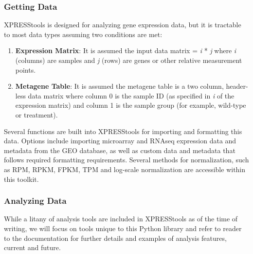 \documentclass[11pt, a4paper, oneside]{article}
\begin{document}
\subsubsection{Getting Data}
XPRESStools is designed for analyzing gene expression data, but it is tractable to most data types assuming two conditions are met:

\begin{enumerate}
  \item \textbf{Expression Matrix}: It is assumed the input data matrix = \textit{i} * \textit{j} where \textit{i} (columns) are samples and \textit{j} (rows) are genes or other relative measurement points.
  \item \textbf{Metagene Table}: It is assumed the metagene table is a two column, header-less data matrix where column 0 is the sample ID (as specified in \textit{i} of the expression matrix) and column 1 is the sample group (for example, wild-type or treatment).
\end{enumerate}

Several functions are built into XPRESStools for importing and formatting this data. Options include importing microarray and RNAseq expression data and metadata from the GEO database, as well as custom data and metadata that follows required formatting requirements. Several methods for normalization, such as RPM, RPKM, FPKM, TPM and log-scale normalization are accessible within this toolkit.

\subsubsection{Analyzing Data}

While a litany of analysis tools are included in XPRESStools as of the time of writing, we will focus on tools unique to this Python library and refer to reader to the documentation for further details and examples of analysis features, current and future.
\end{document}
